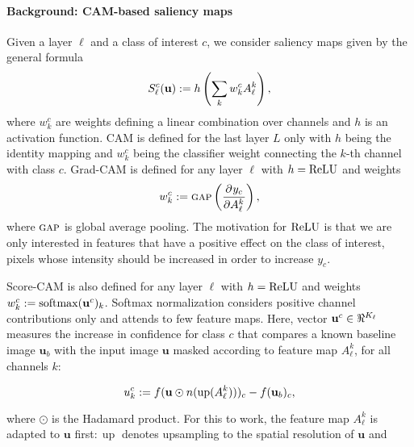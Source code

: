 
\paragraph{Background: CAM-based saliency maps}
\label{sec:oc_back}

Given a layer $\ell$ and a class of interest $c$, we consider saliency maps given by the general 
formula
\begin{equation}
	S^c_\ell(\mathbf{u}) \mathrel{:=} h \left( \sum_k w^c_k A^k_\ell \right),
\label{eq:sal}
\end{equation}
where $w^c_k$ are weights defining a linear combination over channels and $h$ is an activation 
function. CAM \parencite{zhou2016learning} is defined for the last layer $L$ only with $h$ being the 
identity mapping and $w^c_k$ being the classifier weight connecting the $k$-th channel with 
class $c$. Grad-CAM \parencite{selvaraju2017grad} is defined for any layer $\ell$ with $h = {\operatorname{ReLU}}$ and 
weights
\begin{equation}
	w^c_k \mathrel{:=} {\textsc{gap}} \left( \frac{\partial^{}{y_c}}{\partial{{A^k_\ell}^{}}} \right),
\label{eq:gcam}
\end{equation}
where ${\textsc{gap}}$ is global average pooling.
The motivation for ${\operatorname{ReLU}}$ is that we are only interested in features that have a positive effect 
on the class of interest, \ie pixels whose intensity should be increased in order to increase $y_c$.

Score-CAM \parencite{wang2020score} is also defined for any layer $\ell$ with $h = {\operatorname{ReLU}}$ and weights 
$w^c_k \mathrel{:=} \operatorname{softmax}(\mathbf{u}^c)_k$.  Softmax normalization considers positive channel contributions 
only and attends to few feature maps.
Here, vector $\mathbf{u}^c \in \real^{K_\ell}$ measures the increase in confidence for class $c$ that 
compares a known baseline image $\mathbf{u}_b$ with the input image $\mathbf{u}$ masked according to feature 
map $A^k_\ell$, for all channels $k$:

\begin{equation}
	u^c_k \mathrel{:=} f(\mathbf{u} \odot n(\operatorname{up}( A^k_\ell )))_c - f(\mathbf{u}_b)_c,
\label{eq:s-cam}
\end{equation}

where $\odot$ is the Hadamard product. For this to work, the feature map $A^k_\ell$ is adapted
 to $\mathbf{u}$ first$:\operatorname{up}$ denotes upsampling to the spatial resolution of $\mathbf{u}$ and


